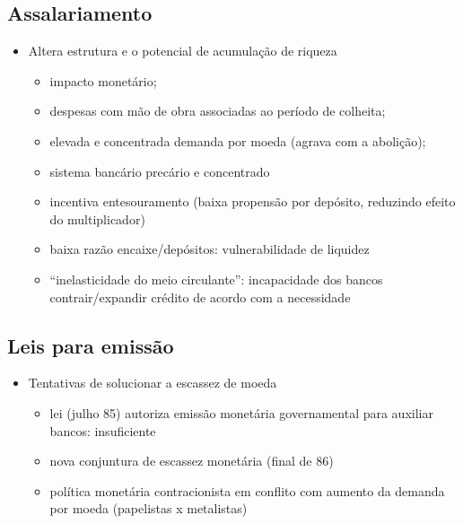 \documentclass[a4paper,12pt]{article}[abntex2]
\begin{document}
\subsection{\textbf{Assalariamento}}
\begin{itemize}
    \item Altera estrutura e o potencial de acumulação de riqueza
    \begin{itemize}
        \item impacto monetário;
    \end{itemize}
    \begin{itemize}
        \item despesas com mão de obra associadas ao período de colheita;
    \end{itemize}
    \begin{itemize}
        \item  elevada e concentrada demanda por moeda (agrava com a abolição);
    \end{itemize}
    \begin{itemize}
        \item sistema bancário precário e concentrado
        \item incentiva entesouramento (baixa
propensão por depósito, reduzindo efeito
do multiplicador)
\item baixa razão encaixe/depósitos:
vulnerabilidade de liquidez
\item “inelasticidade do meio circulante”: incapacidade dos bancos contrair/expandir crédito de acordo com a necessidade
    \end{itemize}
\end{itemize}
\subsection{\textbf{Leis para emissão}}
\begin{itemize}
    \item Tentativas de solucionar a escassez de moeda
    \begin{itemize}
        \item  lei (julho 85) autoriza emissão monetária governamental para auxiliar bancos: insuficiente
    \end{itemize}
    \begin{itemize}
        \item nova conjuntura de escassez monetária (final de 86)
    \end{itemize}
    \begin{itemize}
        \item  política monetária contracionista em conflito com aumento da demanda por moeda (papelistas x metalistas)
    \end{itemize}
\end{itemize}
\end{document}
